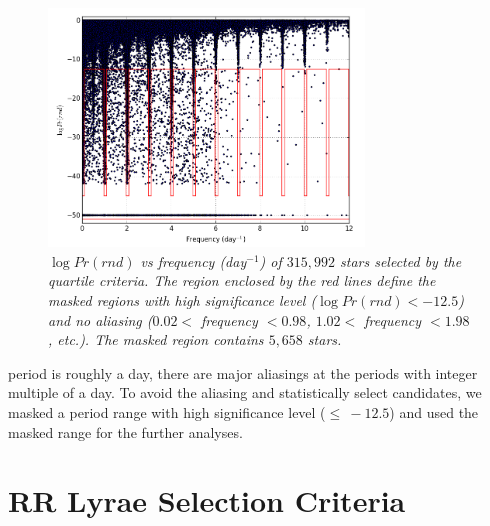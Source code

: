 \documentclass[aps,prb,twocolumn,superscriptaddress]{revtex4-1}
\begin{document}
\begin{figure}[H]
 \centering
 	\includegraphics[width=3.3in]{figures/RlogPr.png}
 \caption{\it \small{$\log{Pr(rnd)}$ vs frequency (day$^{-1}$) of $315,992$ stars selected by the quartile criteria. The region enclosed by the red lines define the masked regions with high significance level ($\log{Pr(rnd)} < -12.5$) and no aliasing ($0.02<$ frequency $<0.98$, $1.02<$ frequency $<1.98$, etc.). The masked region contains $5,658$ stars.}} 
 \label{fig:logPr}
\end{figure}

\noindent period is roughly a day, there are major aliasings at the periods with integer multiple of a day. To avoid the aliasing and statistically select candidates, we masked a period range with high significance level ($\leq~-12.5$) and used the masked range for the further analyses.


\vfill\eject



\section{RR Lyrae Selection Criteria}\label{sec:RRcrit}

\end{document}
